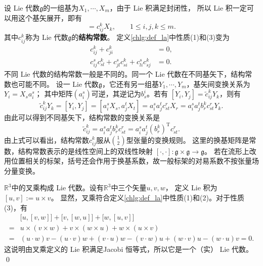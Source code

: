 设 Lie 代数$\mathfrak{g}$的一组基为$X_1, \cdots ,X_m$，由于 Lie 积满足封闭性，
所以 Lie 积一定可以用这个基矢展开，即有
\begin{equation}
    [X_i, X_j] =c_{ij}^k X_k, \qquad 1 \leqslant i,j,k \leqslant m .
\end{equation}
其中$c_{ij}^k$称为 Lie 代数$\mathfrak{g}$的\textbf{结构常数}。
定义\ref{chlg:def_la}中性质(1)和(3)变为
\begin{align}
    c_{ij}^k +c_{ji}^k &= 0,  \\
    c_{ij}^s c_{sl}^k + c_{jl}^s c_{si}^k + c_{li}^s c_{sj}^k &=0. \label{chlg:eqn_CCC}
\end{align}
不同 Lie 代数的结构常数一般是不同的。同一个 Lie 代数在不同基矢下，结构常数也可能不同。
设一 Lie 代数$\mathfrak{g}$，它还有另一组基$Y_1, \cdots ,Y_m$，基矢间变换关系为
$    Y_i = X_s a_{ i}^s  $；
其中矩阵$(a_{ i}^s)$可逆，其逆记为$b_{ s}^i$。若有
$    [Y_i, Y_j] =\tilde{c}^{k}_{ij} Y_k $，则有
\begin{equation}
    \tilde{c}^{k}_{ij} Y_k= [Y_i, Y_j] = [a_{ i}^s X_s, a_{ j}^t X_t]
    =a_{ i}^s a_{ j}^t c_{st}^r X_r
    =a_{ i}^s a_{ j}^t b^k_{ r} c_{st}^r Y_k .
\end{equation}
由此可以得到不同基矢下，结构常数的变换关系是
\begin{equation}\label{chlg:eqn_LAC-trans}
    \tilde{c}^{k}_{ij}  =a_{ i}^s a_{ j}^t b^k_{ r} c_{st}^r
    =a_{ i}^s a_{ j}^t (b^{ k}_{r})^{\mathrm{T}} c_{st}^r  .
\end{equation}
由上式可以看出，结构常数$c^k_{ij}$服从$\binom{1}{2}$型张量的变换规则。
这里的换基矩阵是常数，结构常数表示的是线性空间上的双线性映射
$[\cdot,\cdot]:\mathfrak g\times\mathfrak g\to\mathfrak g$。
若在流形上改用位置相关的标架，括号还会作用于换基系数，故一般标架的对易系数不按张量场分量变换。

\begin{example}
    $\mathbb{R}^3$中的叉乘构成 Lie 代数。设有$\mathbb{R}^3$中三个矢量$u,v,w$，
    定义 Lie 积为$[u,v]:=u \times v$。
    显然，叉乘符合定义\ref{chlg:def_la}中性质(1)和(2)。对于性质(3)，有
    \begin{align*}
        &\bigl[u,[v,w]\bigr]
        +\bigl[v,[w,u]\bigr]+\bigl[w,
        [u,v]\bigr] \\
      =& u \times (v\times w)+v \times
      (w\times u)+w \times (u\times v) \\
      =& (u\cdot w) v  - (u\cdot v) w
        +(v\cdot u) w  - (v\cdot w) u
        +(w\cdot v) u  - (w\cdot u) v = 0 .
    \end{align*}
    这说明由叉乘定义的 Lie 积满足Jacobi 恒等式，所以它是一个（实） Lie 代数。 \qed
\end{example}

